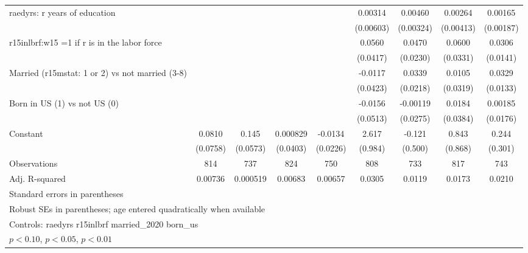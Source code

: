 \begin{table}[htbp]
\begin{tabular}{l*{8}{c}}
\addlinespace
raedyrs: r years of education&                  &                  &                  &                  &  0.00314         &  0.00460         &  0.00264         &  0.00165         \\
                &                  &                  &                  &                  &(0.00603)         &(0.00324)         &(0.00413)         &(0.00187)         \\
\addlinespace
r15inlbrf:w15 =1 if r is in the labor force&                  &                  &                  &                  &   0.0560         &   0.0470\sym{**} &   0.0600\sym{*}  &   0.0306\sym{**} \\
                &                  &                  &                  &                  & (0.0417)         & (0.0230)         & (0.0331)         & (0.0141)         \\
\addlinespace
Married (r15mstat: 1 or 2) vs not married (3-8)&                  &                  &                  &                  &  -0.0117         &   0.0339         &   0.0105         &   0.0329\sym{**} \\
                &                  &                  &                  &                  & (0.0423)         & (0.0218)         & (0.0319)         & (0.0133)         \\
\addlinespace
Born in US (1) vs not US (0)&                  &                  &                  &                  &  -0.0156         & -0.00119         &   0.0184         &  0.00185         \\
                &                  &                  &                  &                  & (0.0513)         & (0.0275)         & (0.0384)         & (0.0176)         \\
\addlinespace
Constant        &   0.0810         &    0.145\sym{**} & 0.000829         &  -0.0134         &    2.617\sym{***}&   -0.121         &    0.843         &    0.244         \\
                & (0.0758)         & (0.0573)         & (0.0403)         & (0.0226)         &  (0.984)         &  (0.500)         &  (0.868)         &  (0.301)         \\
\midrule
Observations    &      814         &      737         &      824         &      750         &      808         &      733         &      817         &      743         \\
Adj. R-squared  &  0.00736         & 0.000519         &  0.00683         &  0.00657         &   0.0305         &   0.0119         &   0.0173         &   0.0210         \\
\bottomrule
\multicolumn{9}{l}{\footnotesize Standard errors in parentheses}\\
\multicolumn{9}{l}{\footnotesize Robust SEs in parentheses; age entered quadratically when available}\\
\multicolumn{9}{l}{\footnotesize Controls:  raedyrs r15inlbrf married\_2020 born\_us}\\
\multicolumn{9}{l}{\footnotesize \sym{*} \(p<0.10\), \sym{**} \(p<0.05\), \sym{***} \(p<0.01\)}\\
\end{tabular}
\end{table}
